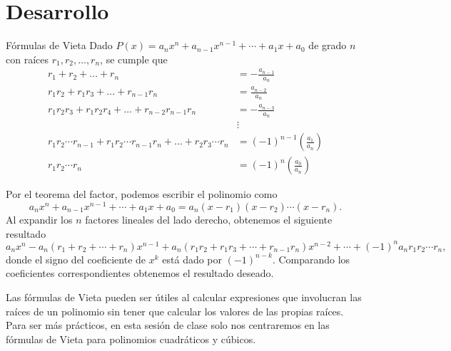 \section{Desarrollo}

\begin{theorem.tcb}{Fórmulas de Vieta}{}
    Dado $P(x) = a_n x^n + a_{n - 1} x^{n - 1} + \cdots  + a_1 x + a_0$ de grado $n$ con raíces $r_1, r_2, \ldots, r_n$, se cumple que
    \begin{align*}
        r_1 + r_2 + \ldots + r_n &= - \frac{a_{n - 1}}{a_n}\\[2mm]
        r_1 r_2 + r_1 r_3 + \ldots + r_{n - 1} r_n &= \frac{a_{n - 2}}{a_n}\\[2mm]
        r_1 r_2 r_3 + r_1 r_2 r_4 + \ldots + r_{n - 2} r_{n - 1} r_n &= -\frac{a_{n - 3}}{a_n}\\[2mm]
        &\vdots\\[2mm]
        r_1 r_2 \cdots r_{n - 1} + r_1 r_2 \cdots r_{n - 1}r_n + \ldots + r_2 r_3 \cdots r_n &= (-1)^{n - 1} \left(\frac{a_1}{a_n}\right)\\[2mm]
        r_1 r_2 \cdots r_n &= (-1)^n \left(\frac{a_0}{a_n}\right)
    \end{align*}
\end{theorem.tcb}

Por el teorema del factor, podemos escribir el polinomio como
\[
    a_n x^n + a_{n - 1} x^{n - 1} + \cdots  + a_1 x + a_0 = a_n (x - r_1)(x - r_2) \cdots (x - r_n).
\]
Al expandir los $n$ factores lineales del lado derecho, obtenemos el siguiente resultado
\[
    a_n x^n - a_n(r_1 + r_2 + \cdots + r_n)x^{n - 1} + a_n(r_1 r_2 + r_1 r_3 + \cdots + r_{n - 1} r_n)x^{n - 2} + \cdots + (-1)^n a_n r_1 r_2 \cdots r_n,
\]
donde el signo del coeficiente de $x^k$ está dado por $(-1)^{n - k}$.
Comparando los coeficientes correspondientes obtenemos el resultado deseado.

Las fórmulas de Vieta pueden ser útiles al calcular expresiones que involucran las raíces de un polinomio sin tener que calcular los valores de las propias raíces.
Para ser más prácticos, en esta sesión de clase solo nos centraremos en las fórmulas de Vieta para polinomios cuadráticos y cúbicos.

